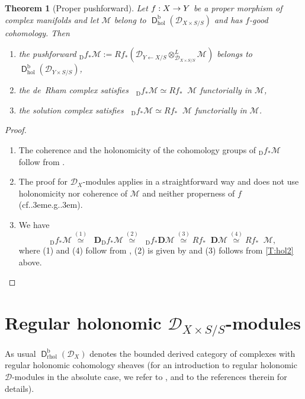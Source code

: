 \documentclass[english]{smfart}
\numberwithin{subsection}{section}
\newenvironment{enumeratea}
{\bgroup\def\theenumi{\alph{enumi}}\begin{enumerate}}
{\end{enumerate}\egroup}
\def\shd{\mathcal{D}}\let\cD\shd
\def\shm{\mathcal{M}}
\newcommand{\bD}{\boldsymbol{D}}
\newcommand{\rb}{\mathrm{b}}
\newcommand{\hol}{\mathrm{hol}}
\newcommand{\rhol}{\mathrm{rhol}}
\newcommand{\XS}{X\times S}
\newcommand{\DXS}{\shd_{\XS/S}}
\newcommand{\DYS}{\shd_{Y\times S/S}}
\DeclareMathOperator{\rD}{\mathsf{D}}
\DeclareMathOperator{\pDR}{{}^\mathrm{p}DR}
\DeclareMathOperator{\pSol}{{}^\mathrm{p}Sol}
\def\cf{cf.\kern.3em}
\def\eg{e.g.\kern.3em}
\newcommand{\Df}{{}_{\scriptscriptstyle\mathrm{D}}f}
\numberwithin{equation}{section}
\theoremstyle{plain}
\newtheorem{theorem}[equation]{Theorem}
\theoremstyle{definition}
\def\to{\mathchoice{\longrightarrow}{\rightarrow}{\rightarrow}{\rightarrow}}
\begin{document}
\begin{theorem}[Proper pushforward]\label{T:hol}
Let $f:X\to Y$ be a proper morphism of complex manifolds and let $\shm$ belong to $\rD^\rb_\hol(\DXS)$ and has $f$-good cohomology. Then
\begin{enumeratea}
\item\label{T:hol1}
the pushforward $\Df_*\shm\!:=\!Rf_*(\shd_{Y\leftarrow X/S}\otimes^L_{\DXS}\shm)$ belongs to $\rD^\rb_\hol(\DYS)$,
\item\label{T:hol2}
the de~Rham complex satisfies $\pDR\Df_*\shm\simeq Rf_*\pDR\shm$ functorially in $\shm$,
\item\label{T:hol3}
the solution complex satisfies $\pSol\Df_*\shm\simeq Rf_*\pSol\shm$ functorially in $\shm$.
\end{enumeratea}
\end{theorem}

\begin{proof}\mbox{}
\begin{enumeratea}
\item
The coherence and the holonomicity of the cohomology groups of $\Df_*\shm$ follow from \cite[Th.\,4.2 and Cor.\,4.3]{Sch-Sch94}.
\item
The proof for $\cD_X$-modules applies in a straightforward way and does not use holonomicity nor coherence of $\shm$ and neither properness of $f$ (\cf \eg \cite[Th.\,4.2.5]{H-T-T08}).
\item
We have
\[
\pSol\Df_*\shm\overset{(1)}\simeq\pDR\bD\Df_*\shm\overset{(2)}\simeq\pDR\Df_*\bD\shm\overset{(3)}\simeq Rf_*\pDR\bD\shm\overset{(4)}\simeq Rf_*\pSol\shm,
\]
where (1) and (4) follow from \cite[(5)]{MF-S12}, (2) is given by \cite[Th.\,5.15]{Sch-Sch94} and (3) follows from \eqref{T:hol2} above.\qedhere
\end{enumeratea}
\end{proof}

\section{Regular holonomic \texorpdfstring{$\DXS$}{DXS}-modules}

\label{subsec:regularity}
As usual $\rD^\rb_\rhol(\shd_X)$ denotes the bounded derived category of complexes with regular holonomic cohomology sheaves (for an introduction to regular holonomic $\shd$\nobreakdash-modules in the absolute case, we refer to \cite{Kashiwara03,Mebkhout87,Mebkhout04,H-T-T08}, and to the references therein for details).
\end{document}

